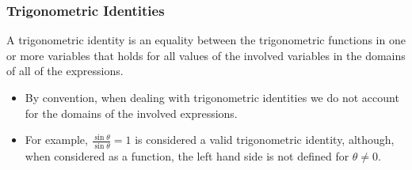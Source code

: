 \begin{frame}
\frametitle{Trigonometric Identities}
\begin{definition}
A trigonometric identity is an equality between the trigonometric functions in one or more variables that holds for all values of the involved variables in the domains of all of the expressions.
\end{definition}
\begin{itemize}
\item<2-> By convention, when dealing with trigonometric identities we do not account for the domains of the involved expressions.
\item<3-> For example, $\frac{\sin\theta}{\sin \theta}=1$ is considered a valid trigonometric identity, although, when considered as a function, the left hand side is not defined for $\theta\neq 0$.
\end{itemize}
\end{frame}
